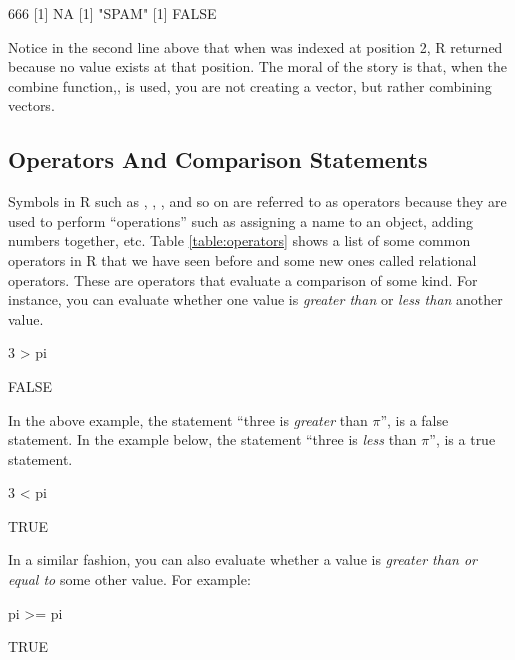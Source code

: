 \begin{outR}
[1] 666
[1] NA
[1] "SPAM"
[1] FALSE
\end{outR}

Notice in the second line above that when  was indexed at position 2, R returned  because no value exists at that position. The moral of the story is that, when the combine function,, is used, you are not creating a vector, but rather combining vectors.


\subsection{Operators And Comparison Statements}
\label{sec:operatorsAndCompair}

Symbols in R such as \R{<-}, \R{+}, \R{-}, and so on are referred to as operators because they are used to perform ``operations'' such as assigning a name to an object, adding numbers together, etc.  Table \ref{table:operators} shows a list of some common operators in R that we have seen before and some new ones called \glspl{relational operator}.  These are operators that evaluate a comparison of some kind.  For instance, you can evaluate whether one value is \textit{greater than} or \textit{less than} another value.

%

\begin{inR}
3 > pi
\end{inR}
\begin{outR}
[1] FALSE
\end{outR}

\noindent
In the above example, the statement ``three is \textit{greater} than $\pi$'', is a false statement.  In the example below, the statement ``three is \textit{less} than $\pi$'', is a true statement.

\begin{inR}
3 < pi
\end{inR}
\begin{outR}
[1] TRUE
\end{outR}

\noindent
In a similar fashion, you can also evaluate whether a value is \textit{greater than or equal to} some other value. For example:

\begin{inR}
pi >= pi
\end{inR}
\begin{outR}
[1] TRUE
\end{outR}

